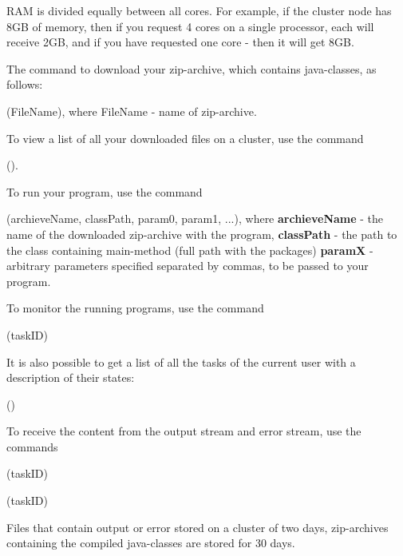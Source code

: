 RAM is divided equally between all cores. For example, if the cluster node has 8GB of memory,
then if you request 4 cores on a single processor, each will receive 2GB, 
and if you have requested one core - then it will get 8GB.

The command to download your zip-archive, which contains java-classes, as follows:

 {(FileName)}, where FileName - name of zip-archive.

To view a list of all your downloaded files on a cluster, use the command

 {()}.

To run your program, use the command

 {(archieveName, classPath, param0, param1, ...)},
where 
{\bf archieveName} - the name of the downloaded zip-archive with the program, 
{\bf classPath} - the path to the class containing main-method (full path with the packages)
{\bf paramX} - arbitrary parameters specified separated by commas, to be passed to your program.

To monitor the running programs, use the command

 {(taskID)}

It is also possible to get a list of all the tasks of the current user with a 
description of their states:

 {()}

To receive the content from the output stream and error stream, use the commands

 {(taskID)}

 {(taskID)}

Files that contain output or error stored on a cluster of two days,
zip-archives containing the compiled java-classes are stored for 30 days.